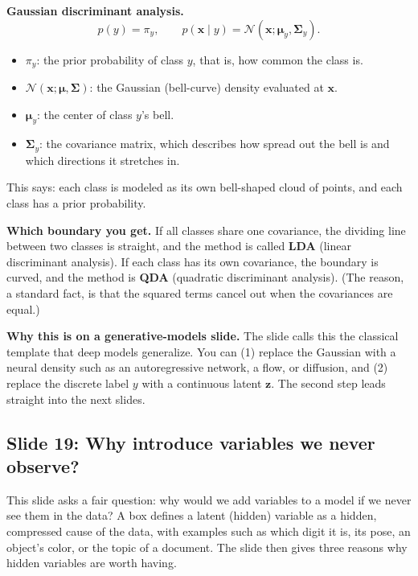 \textbf{Gaussian discriminant analysis.}
\[
p(y)=\pi_y,\qquad p(\mathbf{x}\mid y)=\mathcal{N}(\mathbf{x};\boldsymbol{\mu}_y,\boldsymbol{\Sigma}_y).
\]
\begin{itemize}
\item $\pi_y$: the prior probability of class $y$, that is, how common the class is.
\item $\mathcal{N}(\mathbf{x};\boldsymbol{\mu},\boldsymbol{\Sigma})$: the Gaussian (bell-curve) density evaluated at $\mathbf{x}$.
\item $\boldsymbol{\mu}_y$: the center of class $y$'s bell.
\item $\boldsymbol{\Sigma}_y$: the covariance matrix, which describes how spread out the bell is and which directions it stretches in.
\end{itemize}
This says: each class is modeled as its own bell-shaped cloud of points, and each class has a prior probability.

\textbf{Which boundary you get.} If all classes share one covariance, the dividing line between two classes is straight, and the method is called \textbf{LDA} (linear discriminant analysis). If each class has its own covariance, the boundary is curved, and the method is \textbf{QDA} (quadratic discriminant analysis). (The reason, a standard fact, is that the squared terms cancel out when the covariances are equal.)

\textbf{Why this is on a generative-models slide.} The slide calls this the classical template that deep models generalize. You can (1) replace the Gaussian with a neural density such as an autoregressive network, a flow, or diffusion, and (2) replace the discrete label $y$ with a continuous latent $\mathbf{z}$. The second step leads straight into the next slides.

\subsection*{Slide 19: Why introduce variables we never observe?}

This slide asks a fair question: why would we add variables to a model if we never see them in the data? A box defines a latent (hidden) variable as a hidden, compressed cause of the data, with examples such as which digit it is, its pose, an object's color, or the topic of a document. The slide then gives three reasons why hidden variables are worth having.


